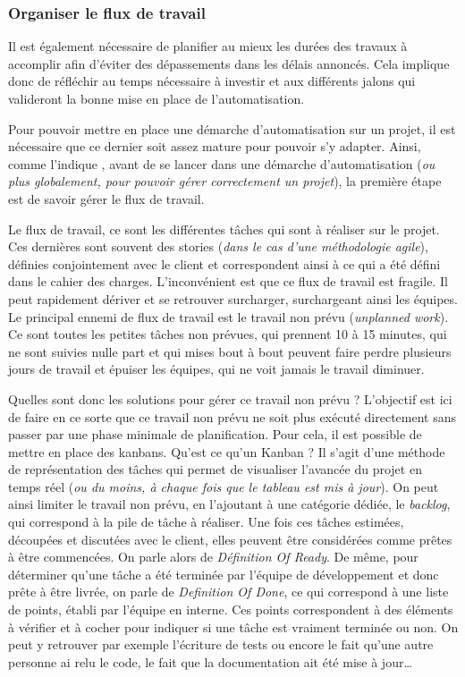 \subsubsection{Organiser le flux de travail}
Il est également nécessaire de planifier au mieux les durées des travaux à accomplir afin d'éviter des dépassements dans les délais annoncés. Cela implique donc de réfléchir au temps nécessaire à investir et aux différents jalons qui valideront la bonne mise en place de l'automatisation. 

Pour pouvoir mettre en place une démarche d'automatisation sur un projet, il est nécessaire que ce dernier soit assez mature pour pouvoir s'y adapter. Ainsi, comme l'indique  \cite{phoenixProject},  avant de se lancer dans une démarche d'automatisation (\emph{ou plus globalement, pour pouvoir gérer correctement un projet}), la première étape est de savoir gérer le flux de travail.

Le flux de travail, ce sont les différentes tâches qui sont à réaliser sur le projet. Ces dernières sont souvent des stories (\emph{dans le cas d'une méthodologie agile}), définies conjointement avec le client et correspondent ainsi à ce qui a été défini dans le cahier des charges. L'inconvénient est que ce flux de travail est fragile. Il peut rapidement dériver et se retrouver surcharger, surchargeant ainsi les équipes. Le principal ennemi de flux de travail est le travail non prévu (\emph{unplanned work}). Ce sont toutes les petites tâches non prévues, qui prennent 10 à 15 minutes, qui ne sont suivies nulle part et qui mises bout à bout peuvent faire perdre plusieurs jours de travail et épuiser les équipes, qui ne voit jamais le travail diminuer.

Quelles sont donc les solutions pour gérer ce travail non prévu ? L'objectif est ici de faire en ce sorte que ce travail non prévu ne soit plus exécuté directement sans passer par une phase minimale de planification. Pour cela, il est possible de mettre en place des kanbans. Qu'est ce qu'un Kanban ? Il s'agit d'une méthode de représentation des tâches qui permet de visualiser l'avancée du projet en temps réel (\emph{ou du moins, à chaque fois que le tableau est mis à jour}). On peut ainsi limiter le travail non prévu, en l'ajoutant à une catégorie dédiée, le \emph{backlog}, qui correspond à la pile de tâche à réaliser. Une fois ces tâches estimées, découpées et discutées avec le client, elles peuvent être considérées comme prêtes à être commencées. On parle alors de \emph{Définition Of Ready}. De même, pour déterminer qu'une tâche a été terminée par l'équipe de développement et donc prête à être livrée, on parle de \emph{Definition Of Done}, ce qui correspond à une liste de points, établi par l'équipe en interne. Ces points correspondent à des éléments à vérifier et à cocher pour indiquer si une tâche est vraiment terminée ou non. On peut y retrouver par exemple l'écriture de tests ou encore le fait qu'une autre personne ai relu le code, le fait que la documentation ait été mise à jour\ldots

